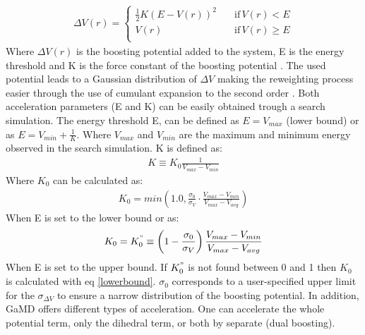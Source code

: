 \begin{equation}
  \begin{aligned}
\Delta V(r) =\begin{cases}
          \frac{1}{2} K \left ( E - V(r) \right )^2 \quad &\text{if} \, V(r) < E \\
          V(r) \quad &\text{if} \, V(r) \geq E \\
     \end{cases}
  \end{aligned}
\end{equation}
Where $\Delta V(r)$ is the boosting potential added to the system, E is the energy threshold and K is the force constant of the boosting potential \cite{miao2015gaussian}. The used potential leads to a Gaussian distribution of $\Delta V$ making the reweighting process easier through the use of cumulant expansion to the second order \cite{miao2014improved}. Both acceleration parameters (E and K) can be easily obtained trough a search simulation. The energy threshold E, can be defined as $E = V_{max}$ (lower bound) or as $E = V_{min} + \frac{1}{K}$. Where $V_{max}$ and $V_{min}$ are the maximum and minimum energy observed in the search simulation. K is defined as: 
\begin{equation}
  \begin{aligned}
  K \equiv K_0 \frac{1}{V_{max} - V_{min}}
    \end{aligned}
\end{equation}
Where $K_0$ can be calculated as:
\begin{equation}
\label{lowerbound}
  \begin{aligned}
K_0 = min\left(1.0, \frac{\sigma_0}{\sigma_V} · \frac{V_{max} - V_{min}}{V_{max} - V_{avg}}\right)
    \end{aligned}
\end{equation}
When E is set to the lower bound or as:
\begin{equation}
  \begin{aligned}
K_0 = K_{0}^{"} \equiv \left(1 - \frac{\sigma_0}{\sigma_V}\right)\frac{V_{max} - V_{min}}{V_{max} - V_{avg}}
  \end{aligned}
\end{equation}
When E is set to the upper bound. If $K_{0}^{"}$ is not found between 0 and 1 then $K_0$ is calculated with eq \eqref{lowerbound}. $\sigma_0$ corresponds to a user-specified upper limit for the $\sigma_{\Delta V}$ to ensure a narrow distribution of the boosting potential. In addition, GaMD offers different types of acceleration. One can accelerate the whole potential term, only the dihedral term, or both by separate (dual boosting).

